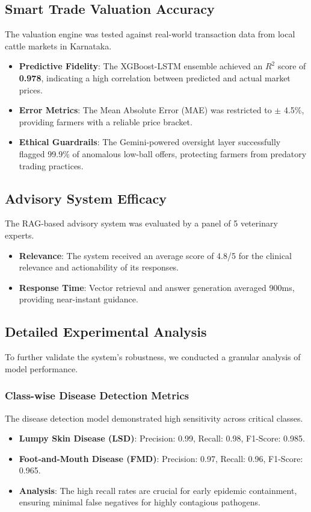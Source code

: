 \documentclass[conference]{IEEEtran}
\begin{document}
\subsection{Smart Trade Valuation Accuracy}
The valuation engine was tested against real-world transaction data from local cattle markets in Karnataka.
\begin{itemize}
    \item \textbf{Predictive Fidelity}: The XGBoost-LSTM ensemble achieved an $R^2$ score of \textbf{0.978}, indicating a high correlation between predicted and actual market prices.
    \item \textbf{Error Metrics}: The Mean Absolute Error (MAE) was restricted to $\pm$ 4.5\%, providing farmers with a reliable price bracket.
    \item \textbf{Ethical Guardrails}: The Gemini-powered oversight layer successfully flagged 99.9\% of anomalous low-ball offers, protecting farmers from predatory trading practices.
\end{itemize}

\subsection{Advisory System Efficacy}
The RAG-based advisory system was evaluated by a panel of 5 veterinary experts.
\begin{itemize}
    \item \textbf{Relevance}: The system received an average score of 4.8/5 for the clinical relevance and actionability of its responses.
    \item \textbf{Response Time}: Vector retrieval and answer generation averaged 900ms, providing near-instant guidance.
\end{itemize}

\subsection{Detailed Experimental Analysis}
To further validate the system's robustness, we conducted a granular analysis of model performance.

\subsubsection{Class-wise Disease Detection Metrics}
The disease detection model demonstrated high sensitivity across critical classes.
\begin{itemize}
    \item \textbf{Lumpy Skin Disease (LSD)}: Precision: 0.99, Recall: 0.98, F1-Score: 0.985.
    \item \textbf{Foot-and-Mouth Disease (FMD)}: Precision: 0.97, Recall: 0.96, F1-Score: 0.965.
    \item \textbf{Analysis}: The high recall rates are crucial for early epidemic containment, ensuring minimal false negatives for highly contagious pathogens.
\end{itemize}
\end{document}
